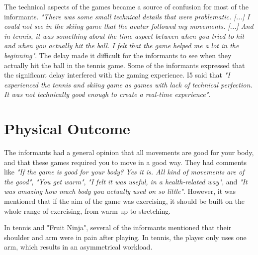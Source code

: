 The technical aspects of the games became a source of confusion for most of the informants. \emph{"There was some small technical details that were problematic. [...] I could not see in the skiing game that the avatar followed my movements. [...] And in tennis, it was something about the time aspect between when you tried to hit and when you actually hit the ball. I felt that the game helped me a lot in the beginning"}. The delay made it difficult for the informants to see when they actually hit the ball in the tennis game. Some of the informants expressed that the significant delay interfered with the gaming experience. I5 said that \emph{"I experienced the tennis and skiing game as games with lack of technical perfection. It was not technically good enough to create a real-time experience"}. 

\section{Physical Outcome}

The informants had a general opinion that all movements are good for your body, and that these games required you to move in a good way. They had comments like \emph{"If the game is good for your body? Yes it is. All kind of movements are of the good"}, \emph{"You get warm"}, \emph{"I felt it was useful, in a health-related way"}, and \emph{"It was amazing how much body you actually used on so little"}. However, it was mentioned that if the aim of the game was exercising, it should be built on the whole range of exercising, from warm-up to stretching. 

In tennis and "Fruit Ninja", several of the informants mentioned that their shoulder and arm were in pain after playing. In tennis, the player only uses one arm, which results in an asymmetrical workload.  
    

